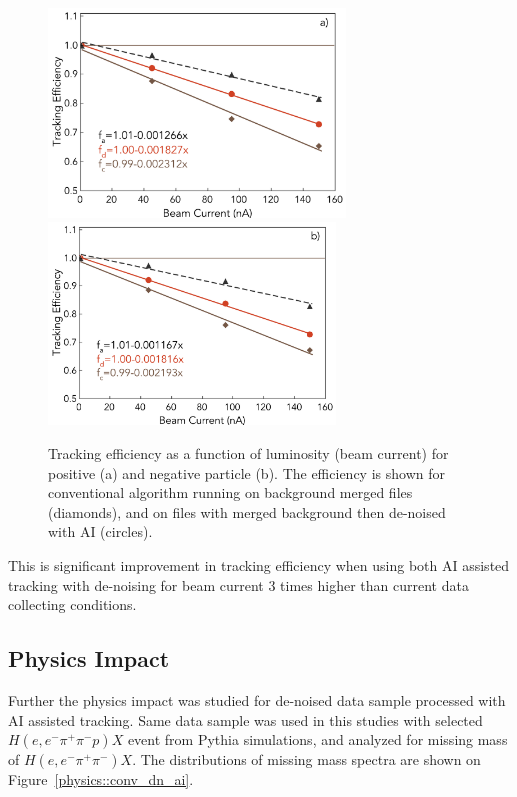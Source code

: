 \begin{figure}[!h]
\begin{center}
 \includegraphics[width=3.1in]{images/figure_lscan_pos_ai.pdf}
 \includegraphics[width=3in]{images/figure_lscan_neg_ai.pdf}
\caption {Tracking efficiency as a function of luminosity (beam current) for positive (a) and negative particle (b).  The efficiency is shown for
conventional algorithm running on background merged files (diamonds), and on files with merged background then de-noised with AI (circles).}
 \label{lscan::conv_dn_ai}
 \end{center}
\end{figure}

This is significant improvement in tracking efficiency when using both AI assisted tracking with de-noising for beam current 3 times higher than current data collecting conditions.

\subsection{Physics Impact}

Further the physics impact was studied for de-noised data sample processed with AI assisted tracking. Same data sample was used in this studies with selected $H(e,e^-\pi^+\pi^-p)X$ event from Pythia simulations, and analyzed for
missing mass of $H(e,e^-\pi^+\pi^-)X$. The distributions of missing mass spectra are shown on Figure~\ref{physics::conv_dn_ai}.

